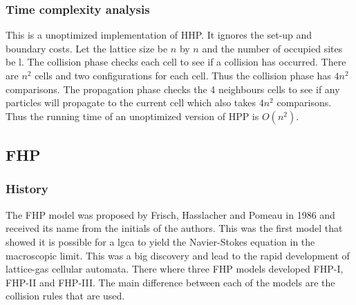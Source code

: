 \documentclass[a4paper,10pt]{article}
\begin{document}
\subsubsection{Time complexity analysis}
This is a unoptimized implementation of HHP. It ignores the set-up and boundary costs. Let the lattice size be $n$ by $n$ and the number of occupied sites be l. The collision phase checks each cell to see if a collision has occurred. There are $n^2$ cells and two configurations for each cell. Thus the collision phase has $4n^2$ comparisons.
 The propagation phase checks the 4 neighbours cells to see if any particles will propagate to the current cell which also takes $4n^2$ comparisons. Thus the running time of an unoptimized version of HPP is
 $O(n^2)$.
\subsection{FHP}
\subsubsection{History}
The FHP model was proposed by Frisch, Hasslacher and Pomeau in 1986 and received its name from the initials of the authors. This was the first model that showed it is possible for a \acrshort{lgca} to yield the Navier-Stokes equation in the macroscopic limit. This was a big discovery and lead to the rapid development of lattice-gas cellular automata. There where three FHP models developed FHP-I, FHP-II and FHP-III.
The main difference between each of the models are the collision rules that are used.
\end{document}
